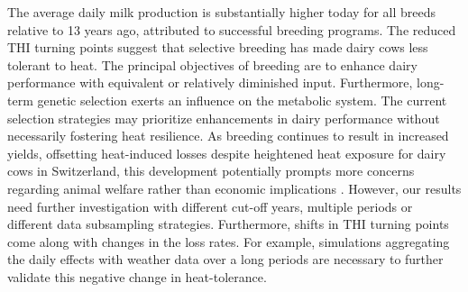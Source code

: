 The average daily milk production is substantially higher today for all breeds relative to 13 years ago, attributed to successful breeding programs. The reduced THI turning points suggest that selective breeding has made dairy cows less tolerant to heat. The principal objectives of breeding are to enhance dairy performance with equivalent or relatively diminished input. Furthermore, long-term genetic selection exerts an influence on the metabolic system. The current selection strategies may prioritize enhancements in dairy performance without necessarily fostering heat resilience. As breeding continues to result in increased yields, offsetting heat-induced losses despite heightened heat exposure for dairy cows in Switzerland, this development potentially prompts more concerns regarding animal welfare rather than economic implications \citep{koenig_2023}. However, our results need further investigation with different cut-off years, multiple periods or different data subsampling strategies. Furthermore, shifts in THI turning points come along with changes in the loss rates. For example, simulations aggregating the daily effects with weather data over a long periods are necessary to further validate this negative change in heat-tolerance.